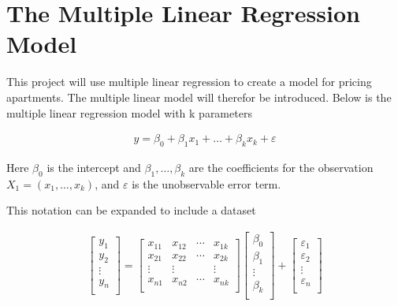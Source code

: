 \section{The Multiple Linear Regression Model}

This project will use multiple linear regression to create a model for pricing apartments. The multiple linear model will therefor be introduced. Below is the multiple linear regression model with k parameters 

\begin{align}
  y = \beta_0 + \beta_1 x_1 + \ldots + \beta_k x_k + \varepsilon
\end{align}

Here $\beta_0$ is the intercept and $\beta_1, \ldots, \beta_k$ are the coefficients for the observation $X_1 = (x_1, \ldots, x_k)$, and $\varepsilon$ is the unobservable error term.

This notation can be expanded to include a dataset 

\begin{align}
  \begin{bmatrix}
    y_1 \\ y_2 \\ \vdots \\ y_n \\
  \end{bmatrix}
  =
  \begin{bmatrix}
    x_{11} & x_{12} & \cdots & x_{1k} \\
    x_{21} & x_{22} & \cdots & x_{2k} \\ \vdots & \vdots & & \vdots \\ x_{n1} & x_{n2} & \cdots & x_{nk} \\
  \end{bmatrix}
  \begin{bmatrix}
    \beta_0 \\ \beta_1 \\ \vdots \\ \beta_k \\
  \end{bmatrix} +
  \begin{bmatrix}
    \varepsilon_1 \\ \varepsilon_2 \\ \vdots \\ \varepsilon_n \\
  \end{bmatrix}
\end{align}

